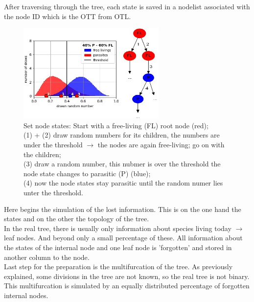     After traversing through the tree, each state is saved in a nodelist associated with the node ID 
      which is the OTT from OTL. \\
    \begin{figure}
      \centering
      \includegraphics[width=0.65\textwidth]{Figures/40-60_all.jpg}
      \caption{Set node states: Start with a free-living (FL) root node (red); \\
        (1) + (2) draw random numbers for its children, the numbers are under the threshold 
        $\rightarrow$ the nodes are again free-living; go on with the children; \\
        (3) draw a random number, this nubmer is over the threshold the node state changes to parasitic (P) (blue); \\
        (4) now the node states stay parasitic until the random numer lies unter the threshold.}
      \label{fig:set node states}
    \end{figure}
    Here begins the simulation of the lost information. This is on the one hand the states and on the 
      other the topology of the tree. \\

    In the real tree, there is usually only information about species living today $\rightarrow$ leaf 
      nodes. And beyond only a small percentage of these. All information about the states of the 
      internal node and one leaf node is 'forgotten' and stored in another column to the node. \\

    Last step for the preparation is the multifurcation of the tree. As previously explained, some 
      divisions in the tree are not known, so the real tree is not binary. This multifurcation is 
      simulated by an equally distributed percentage of forgotten internal nodes. \\
    
